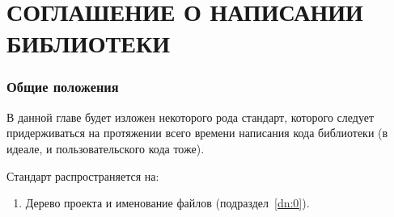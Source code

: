 \chapter{СОГЛАШЕНИЕ О НАПИСАНИИ БИБЛИОТЕКИ}
\subsection{Общие положения}
В данной главе будет изложен некоторого рода стандарт, которого следует придерживаться на протяжении всего времени написания кода библиотеки (в идеале, и пользовательского кода тоже).

Стандарт распространяется на:
\begin{enumerate}
	\item Дерево проекта и именование файлов (подраздел~\ref{dn:0}).
\end{enumerate}

\label{dn:0}